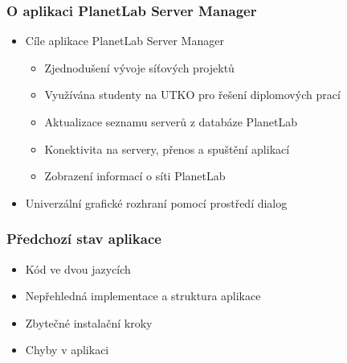 \documentclass[%
  12pt,       				%
	t,                  %
	aspectratio=1610,   %
	unicode,						%
]{beamer}				    	%
\begin{document}
\begin{frame} 
\frametitle{O aplikaci PlanetLab Server Manager}
\begin{itemize}
	\item Cíle aplikace PlanetLab Server Manager
		\begin{itemize}
			\item Zjednodušení vývoje síťových projektů
			\item Využívána studenty na UTKO pro řešení diplomových prací
			\item Aktualizace seznamu serverů z databáze PlanetLab
			\item Konektivita na servery, přenos a spuštění aplikací
			\item Zobrazení informací o síti PlanetLab
		\end{itemize}
	\item Univerzální grafické rozhraní pomocí prostředí dialog
\end{itemize}
\end{frame} 

\begin{frame} 
\frametitle{Předchozí stav aplikace}
\begin{itemize}
	\item Kód ve dvou jazycích
	\item Nepřehledná implementace a struktura aplikace
	\item Zbytečné instalační kroky
	\item Chyby v aplikaci

\end{itemize}
\end{frame} 
\end{document}
